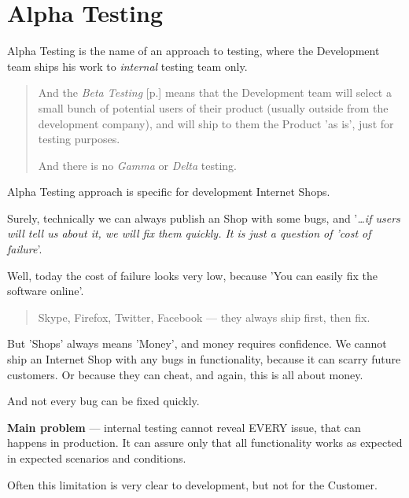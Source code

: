\section{Alpha Testing}
\label{sec:Alpha Testing}

Alpha Testing is the name of an approach to testing, where the Development team ships his work to \emph{internal} testing team only.

\begin{quote}
And the \emph{Beta Testing} [p.\pageref{sec:Beta Testing}] means that the Development team will select a small bunch of potential users of their product (usually outside from the development company), and will ship to them the Product 'as is', just for testing purposes.

And there is no \emph{Gamma} or \emph{Delta} testing.
\end{quote}

Alpha Testing approach is specific for development Internet Shops.

Surely, technically we can always publish an Shop with some bugs, and '\textit{…if users will tell us about it, we will fix them quickly. It is just a question of 'cost of failure}'. 

Well, today the cost of failure looks very low, because 'You can easily fix the software online'.

\begin{quote}
Skype, Firefox, Twitter, Facebook — they always ship first, then fix.
\end{quote}

But 'Shops' always means 'Money', and money requires confidence. We cannot ship an Internet Shop with any bugs in functionality, because it can scarry future customers. Or because they can cheat, and again, this is all about money. 

And not every bug can be fixed quickly.

\textbf{Main problem} — internal testing cannot reveal EVERY issue, that can happens in production. It can assure only that all functionality works as expected in expected scenarios and conditions. 

Often this limitation is very clear to development, but not for the Customer.